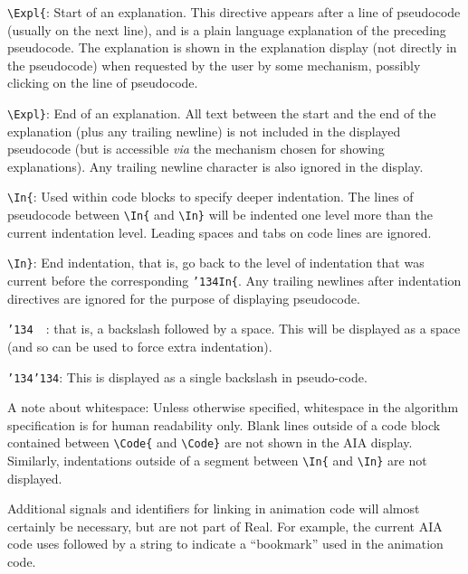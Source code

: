 \documentclass[11pt]{article}
\newcommand{\slant}{\texttt{\char'134}}        %
\begin{document}
\begin{description}
\item{\verb~\Expl{~:}
Start of an explanation. This directive appears after a line of pseudocode 
(usually on the next line), and is a plain language explanation of the 
preceding pseudocode.  
The explanation is shown in the explanation display 
(not directly in the pseudocode) when requested by the user by some mechanism, 
possibly clicking on the line of pseudocode.

\item{\verb~\Expl}~:}
End of an explanation. All text between the start and the
end of the explanation (plus any trailing newline) is not 
included in the displayed pseudocode
(but is accessible {\it via} the mechanism chosen for showing explanations).
Any trailing newline character is also ignored in the display.

\item{\verb~\In{~:}
Used within code blocks to specify deeper indentation.
The lines of pseudocode between {\verb~\In{~} and {\verb~\In}~} will be 
indented one level more than the current indentation level. 
Leading spaces and tabs on code lines are ignored.

\item{\verb~\In}~:}
End indentation, that is, go back to the level of indentation
that was current before the corresponding 
\texttt{\slant}\verb!In{!. 
Any trailing newlines after indentation directives are ignored for 
the purpose of displaying pseudocode.

\item{\texttt{\slant}~~:}
that is, a backslash followed by a space. This will be displayed
as a space (and so can be used to force extra indentation).

\item{\texttt{\slant}\texttt{\slant}:}
This is displayed as a single backslash in pseudo-code.
\end{description}

A note about whitespace: Unless otherwise specified, whitespace in the 
algorithm specification is for human readability only. 
Blank lines outside of a code block contained between {\verb~\Code{~} 
and {\verb~\Code}~} are not shown in the AIA display.  
Similarly, indentations outside of a segment between {\verb~\In{~} and 
{\verb~\In}~} are not displayed.

Additional signals and identifiers for linking in animation code will
almost certainly be necessary, but are not part of Real. For example,
the current AIA code uses \verb@\B@ followed by a string to indicate a
``bookmark'' used in the animation code.
\end{document}
